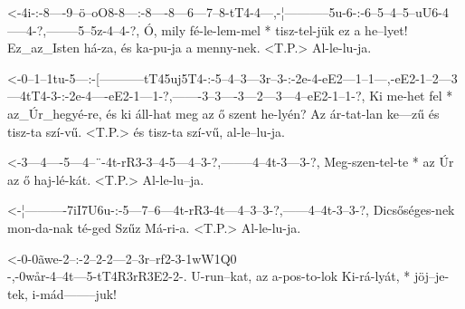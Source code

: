   {<-4i-:-8----9--ö--oO8-8---:-8----8---6---7--8-tT4-4---,-¦-----------5u-6-:-6--5--4--5--uU6-4-----4-?,--------5--5z-4--4-?,}
  {  Ó,   mily fé-le-lem-mel * tisz-tel-jük ez a he--lyet! Ez_az_Isten há-za, és ka-pu-ja a   menny-nek. <T.P.> Al-le-lu-ja.}



  {<-0--1--1tu-5---:-[-----------tT45uj5T4-:-5--4--3---3r--3-:-2e-4-eE2---1--1---,-eE2-1--2---3---4tT4-3-:-2e-4----eE2-1---1-?,-------3--3----3---2---3---4--eE2-1--1-?,}
  {  Ki me-het fel * az_Úr_hegyé-re,         és ki áll-hat meg az ő szent he-lyén? Az  ár-tat-lan ke---zű  és tisz-ta  szí-vű. <T.P.> és tisz-ta  szí-vű, al-le--lu-ja.}

  {<-3---4----5---4--¨-4t-rR3-3--4-5---4--3-?,--------4--4t-3---3-?,}
  {  Meg-szen-tel-te * az Úr  az ő haj-lé-kát. <T.P.> Al-le-lu--ja.}

  {<-¦----------7iI7U6u-:-5---7--6---4t-rR3-4t---4--3--3-?,------4--4t-3--3-?,}
  {  Dicsőséges-nek       mon-da-nak té-ged Szűz Má-ri-a. <T.P.> Al-le-lu-ja.}



  {<-0-0ãwe-2--:-2--2-2---2--3r--rf2-3-1wW1Q0\\-,-0wår-4--4t---5-tT4R3rR3E2-2-.}
  {  U-run--kat, az a-pos-to-lok Ki-rá-lyát,    * jöj--je-tek, i-mád--------juk!}


